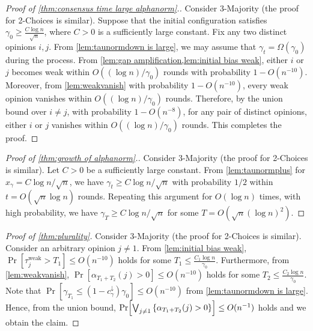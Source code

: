 \documentclass[letterpaper,11pt]{article}
\newcommand{\alphanorm}{\gamma}
\newcommand{\cnormdown}{c^{\downarrow}_\alphanorm}
\newcommand{\taujweak}{\tau^{\mathrm{weak}}_j}
\newcommand{\xnorm}{x_{\alphanorm}}
\begin{document}
\begin{proof}[Proof of \cref{thm:consensus time large alphanorm}.]
  Consider 3-Majority (the proof for 2-Choices is similar).
  Suppose that the initial configuration satisfies $ \alphanorm_0 \ge  \frac{C\log n}{\sqrt{n}}$, where $C>0$ is a sufficiently large constant.
  Fix any two distinct opinions $ i,j $.
  From \cref{lem:taunormdown is large}, we may assume that $\alphanorm_t =\Omega(\alphanorm_0)$ during the process.
  From \cref{lem:gap amplification,lem:initial bias weak}, either $i$ or $j$ becomes weak within $O((\log n)/\alphanorm_0)$ rounds with probability $1-O(n^{-10})$.
  Moreover, from \cref{lem:weakvanish} with probability $ 1-O(n^{-10}) $, every weak opinion vanishes within $ O((\log n)/\alphanorm_0) $ rounds.
  Therefore, by the union bound over $ i\ne j $, with probability $ 1-O(n^{-8}) $,
    for any pair of distinct opinions, either $ i $ or $ j $ vanishes within $ O((\log n)/\alphanorm_0) $ rounds.
  This completes the proof.
\end{proof}

\begin{proof}[Proof of \cref{thm:growth of alphanorm}.]
  Consider 3-Majority (the proof for 2-Choices is similar).
  Let $C>0$ be a sufficiently large constant.
  From \cref{lem:taunormplus} for $\xnorm = C\log n / \sqrt{n}$, we have $\alphanorm_t \ge C\log n/\sqrt{n}$ with probability $1/2$ within $t=O(\sqrt{n}\log n)$ rounds.
  Repeating this argument for $O(\log n)$ times,
  with high probability, we have $\alphanorm_T \ge C\log n / \sqrt{n}$ for some $T=O(\sqrt{n}(\log n)^{2})$.  
\end{proof}

\begin{proof}[Proof of \cref{thm:plurality}]
  Consider 3-Majority (the proof for 2-Choices is similar).
    Consider an arbitrary opinion $j\neq 1$.
    From \cref{lem:initial bias weak}, $\Pr[\taujweak>T_1]\leq O(n^{-10})$ holds for some $T_1\leq \frac{C_1\log n}{\alphanorm_0}$.
    Furthermore, from \cref{lem:weakvanish}, $\Pr[\alpha_{T_1+T_2}(j)>0]\leq O(n^{-10})$ holds for some $T_2\leq \frac{C_2\log n}{\alphanorm_0}$.
    Note that $\Pr[\alphanorm_{T_1}\leq  (1-\cnormdown)\alphanorm_0]\leq O(n^{-10})$ from \cref{lem:taunormdown is large}.
    Hence, from the union bound, $\Pr[\bigvee_{j\neq 1}\qty{\alpha_{T_1+T_2}(j)>0}]\leq O(n^{-1})$ holds and we obtain the claim.
\end{proof}
\end{document}

